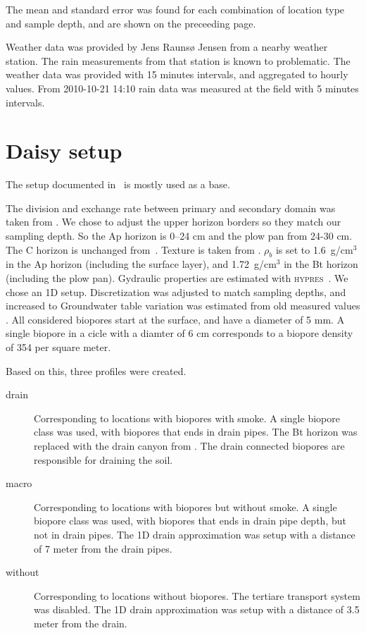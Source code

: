 \documentclass[a4paper]{article}
\begin{document}
The mean and standard error was found for each combination of location
type and sample depth, and are shown on the preceeding page.

Weather data was provided by Jens Raunsø Jensen from a nearby weather
station.  The rain measurements from that station is known to
problematic.  The weather data was provided with 15 minutes intervals,
and aggregated to hourly values.  From 2010-10-21 14:10 rain data was
measured at the field with 5 minutes intervals.

\section*{Daisy setup}

The setup documented in~\citet{mst-agrovand} is mostly used as a base.

The division and exchange rate between primary and secondary domain
was taken from \citet{mst-agrovand}.  We chose to adjust the upper
horizon borders so they match our sampling depth.  So the Ap horizon
is 0--24 cm and the plow pan from 24-30 cm.  The C horizon is
unchanged from~\cite{mst-agrovand}.  Texture is taken from
\citet{mst-agrovand}. $\rho_b$ is set to 1.6~g/cm$^3$ in the Ap
horizon (including the surface layer), and 1.72~g/cm$^3$ in the Bt
horizon (including the plow pan).  Gydraulic properties are estimated
with \textsc{hypres}~\citep{hypres}.  We chose an 1D setup.
Discretization was adjusted to match sampling depths, and increased to
Groundwater table variation was estimated from old measured values
\citep{mst-agrovand}.  All considered biopores start at the surface,
and have a diameter of 5 mm.  A single biopore in a cicle with a
diamter of 6 cm corresponds to a biopore density of 354 per square
meter.

Based on this, three profiles were created.
\begin{description}
\item[drain] Corresponding to locations with biopores with smoke.  A
  single biopore class was used, with biopores that ends in drain
  pipes.  The Bt horizon was replaced with the drain canyon from
  \citet{mst-agrovand}.  The drain connected biopores are responsible
  for draining the soil.
\item[macro] Corresponding to locations with biopores but without
  smoke.  A single biopore class was used, with biopores that ends in
  drain pipe depth, but not in drain pipes.  The 1D drain
  approximation was setup with a distance of 7 meter from the drain
  pipes.
\item[without] Corresponding to locations without biopores.  The
  tertiare transport system was disabled.  The 1D drain approximation
  was setup with a distance of 3.5 meter from the drain.
\end{description}
\end{document}
